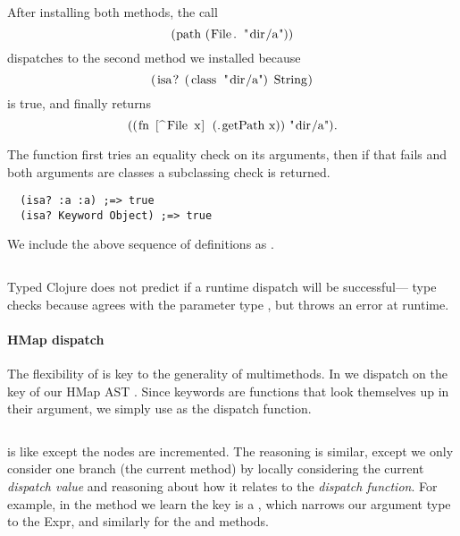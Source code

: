 After installing both methods, the call 
$$
\clj{(path (File. "dir/a"))}
$$
dispatches to the second method we installed because
$$
\clj{(isa? (class "dir/a") String)}
$$
is true, and finally returns 
$$
\clj{((fn [^File x] (.getPath x)) "dir/a")}.
$$

The  function first tries an equality check
on its arguments, then if that fails
and both arguments are classes a subclassing
check is returned.
\begin{verbatim}
  (isa? :a :a) ;=> true
  (isa? Keyword Object) ;=> true
\end{verbatim}

We include the above sequence of definitions as .

\begin{Code}
\begin{exmp}
\inputminted[firstline=5,lastline=10]{clojure}{code/demo/src/demo/rep.clj}
\label{example:rep}
\end{exmp}
\end{Code}

Typed Clojure does not predict if a runtime dispatch will be successful--- 
type checks because  agrees with the parameter type ,
but throws an error at runtime.

\paragraph{HMap dispatch} The flexibility of  is key to the generality of multimethods. 
In  we
dispatch on the  key 
of our HMap AST .
Since keywords are functions that look themselves up in their argument, we simply
use  as the dispatch function.

\begin{exmp}
\inputminted[firstline=5,lastline=18]{clojure}{code/demo/src/demo/eg5.clj}
\label{example:incmap}
\end{exmp}

 is like  except the nodes are incremented.
The reasoning is similar, except we only consider one branch (the current method) by
locally considering the current \emph{dispatch value} and reasoning about how it relates
to the \emph{dispatch function}.
For example, 
in the  method we learn the  key is a , which
narrows our argument type to the  Expr, and similarly for the 
and  methods.


